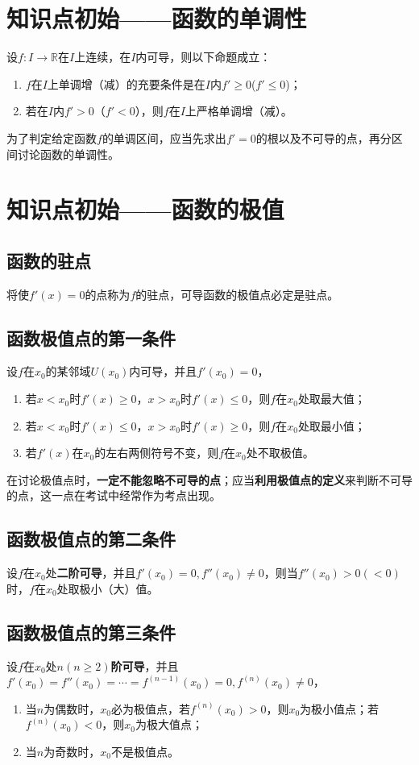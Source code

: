 \section{知识点初始——函数的单调性}
设$f:I\to\mathbb{R}$在$I$上连续，在$I$内可导，则以下命题成立：
\begin{enumerate}
	\item $f$在$I$上单调增（减）的充要条件是在$I$内$f'\geq 0$($f'\leq 0$)；
	\item 若在$I$内$f'>0$（$f'<0$），则$f$在$I$上严格单调增（减）。
\end{enumerate}
\begin{remark}
	为了判定给定函数$f$的单调区间，应当先求出$f'=0$的根以及不可导的点，再分区间讨论函数的单调性。
\end{remark}
\section{知识点初始——函数的极值}
\subsection{函数的驻点}
将使$f'(x)=0$的点称为$f$的驻点，可导函数的极值点必定是驻点。
\subsection{函数极值点的第一条件}
设$f$在$x_0$的某邻域$U(x_0)$内可导，并且$f'(x_0)=0$，
\begin{enumerate}
	\item 若$x<x_0$时$f'(x)\geq 0$，$x>x_0$时$f'(x)\leq 0$，则$f$在$x_0$处取最大值；
	\item 若$x<x_0$时$f'(x)\leq 0$，$x>x_0$时$f'(x)\geq 0$，则$f$在$x_0$处取最小值；
	\item 若$f'(x)$在$x_0$的左右两侧符号不变，则$f$在$x_0$处不取极值。
\end{enumerate}
\begin{remark}
	在讨论极值点时，\textbf{一定不能忽略不可导的点}；应当\textbf{利用极值点的定义}来判断不可导的点，这一点在考试中经常作为考点出现。
\end{remark}
\subsection{函数极值点的第二条件}
设$f$在$x_0$处\textbf{二阶可导}，并且$f'(x_0)=0,f''(x_0)\neq 0$，则当$f''(x_0)>0(<0)$时，$f$在$x_0$处取极小（大）值。
\subsection{函数极值点的第三条件}
设$f$在$x_0$处\textbf{$n(n\geq 2)$阶可导}，并且$f'(x_0)=f''(x_0)=\cdots =f^{(n-1)}(x_0)=0,f^{(n)}(x_0)\neq 0$，
\begin{enumerate}
	\item 当$n$为偶数时，$x_0$必为极值点，若$f^{(n)}(x_0)>0$，则$x_0$为极小值点；若$f^{(n)}(x_0)<0$，则$x_0$为极大值点；
	\item 当$n$为奇数时，$x_0$不是极值点。
\end{enumerate}
